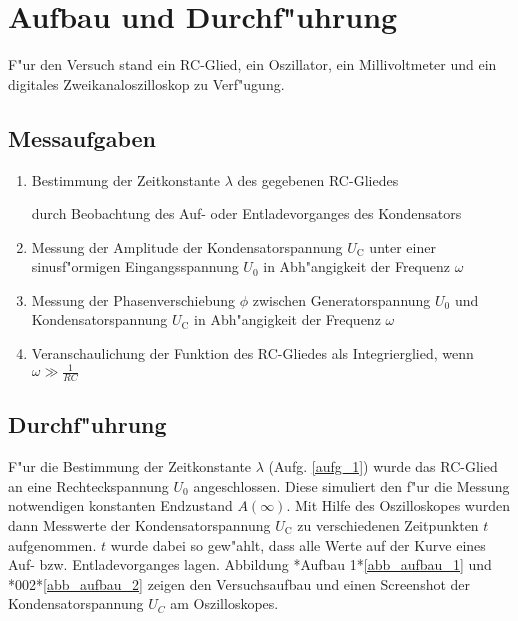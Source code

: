 \documentclass{scrartcl}
\begin{document}
	\section{Aufbau und Durchf"uhrung}

		F"ur den Versuch stand ein RC-Glied, ein Oszillator, ein Millivoltmeter und ein digitales Zweikanaloszilloskop zu Verf"ugung.


		\subsection{Messaufgaben}

			\begin{enumerate}
				\item \label{aufg_1} Bestimmung der Zeitkonstante $\lambda$ des gegebenen RC-Gliedes

				durch Beobachtung des Auf- oder Entladevorganges des Kondensators
				\item \label{aufg_2} Messung der Amplitude der Kondensatorspannung $U_{\mathrm{C}}$ unter einer sinusf"ormigen Eingangsspannung $U_0$ in Abh"angigkeit der Frequenz $\omega$

				\item \label{aufg_3} Messung der Phasenverschiebung $\phi$ zwischen Generatorspannung $U_0$ und Kon\-den\-sator\-spannung $U_{\mathrm{C}}$ in Abh"angigkeit der Frequenz $\omega$

				\item \label{aufg_4} Veranschaulichung der Funktion des RC-Gliedes als Integrierglied, wenn $\omega \gg \frac{1}{RC}$

			\end{enumerate}

		\subsection{Durchf"uhrung}

			F"ur die Bestimmung der Zeitkonstante $\lambda$ (Aufg. \ref{aufg_1}) wurde das RC-Glied an eine Rechteck\-spannung $U_0$ angeschlossen.
			Diese simuliert den f"ur die Messung notwendigen konstanten Endzustand $A(\infty)$.
			Mit Hilfe des Oszilloskopes wurden dann Messwerte der Konden\-sator\-spannung $U_{\mathrm{C}}$ zu verschiedenen Zeitpunkten $t$ aufgenommen.
			$t$ wurde dabei so gew"ahlt, dass alle Werte auf der Kurve eines Auf- bzw. Entladevorganges lagen.
			Ab\-bil\-dung *Aufbau 1*\ref{abb_aufbau_1} und *002*\ref{abb_aufbau_2} zeigen den Versuchsaufbau und einen Screenshot der Konden\-sator\-spannung $U_C$ am Oszilloskopes.\\
\end{document}
